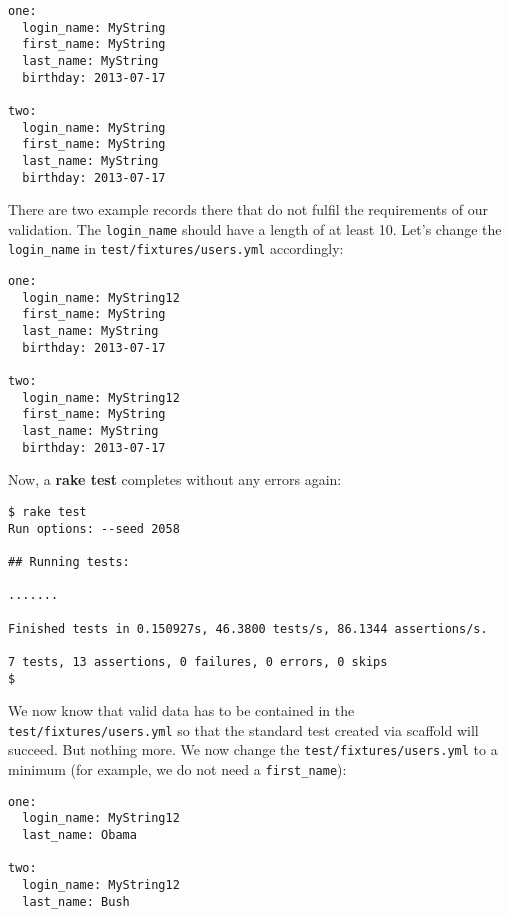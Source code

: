 \documentclass[a4paper]{book}
\begin{document}
\begin{shaded}\begin{verbatim}
one:
  login_name: MyString
  first_name: MyString
  last_name: MyString
  birthday: 2013-07-17

two:
  login_name: MyString
  first_name: MyString
  last_name: MyString
  birthday: 2013-07-17
\end{verbatim}\end{shaded}

There are two example records there that do not fulfil the requirements of our validation. The \texttt{login\_name} should have a length of at least 10. Let's change the \texttt{login\_name} in \texttt{test/fixtures/users.yml} accordingly:

\begin{shaded}\begin{verbatim}
one:
  login_name: MyString12
  first_name: MyString
  last_name: MyString
  birthday: 2013-07-17

two:
  login_name: MyString12
  first_name: MyString
  last_name: MyString
  birthday: 2013-07-17
\end{verbatim}\end{shaded}

Now, a \textbf{rake test} completes without any errors again:

\begin{shaded}\begin{verbatim}
$ rake test
Run options: --seed 2058

## Running tests:

.......

Finished tests in 0.150927s, 46.3800 tests/s, 86.1344 assertions/s.

7 tests, 13 assertions, 0 failures, 0 errors, 0 skips
$
\end{verbatim}\end{shaded}

We now know that valid data has to be contained in the \texttt{test/fixtures/users.yml} so that the standard test created via scaffold will succeed. But nothing more. We now change the \texttt{test/fixtures/users.yml} to a minimum (for example, we do not need a \texttt{first\_name}):

\begin{shaded}\begin{verbatim}
one:
  login_name: MyString12
  last_name: Obama

two:
  login_name: MyString12
  last_name: Bush
\end{verbatim}\end{shaded}
\end{document}
